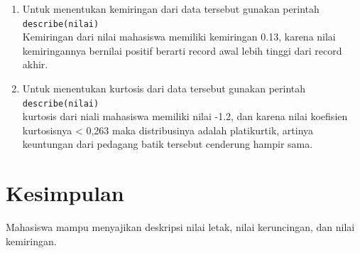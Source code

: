 \documentclass[a4paper,12pt]{article}
\begin{document}
\begin{enumerate}[label=\alph*.]
	\item 
	\begin{minipage}[t]{\linewidth}
		\raggedright
	\end{minipage}
	Untuk menentukan kemiringan dari data tersebut gunakan perintah\\
	\texttt{describe(nilai)}\\
	Kemiringan dari nilai mahasiswa memiliki kemiringan 0.13, karena nilai kemiringannya bernilai positif berarti record awal lebih tinggi dari record akhir.
	
	\item 
	\begin{minipage}[t]{\linewidth}
		\raggedright
	\end{minipage}
	Untuk menentukan kurtosis dari data tersebut gunakan perintah\\
	\texttt{describe(nilai)}\\
	kurtosis dari niali mahasiswa memiliki nilai -1.2, dan karena nilai koefisien kurtosisnya < 0,263 maka distribusinya adalah platikurtik, artinya keuntungan dari pedagang batik tersebut cenderung hampir sama.
\end{enumerate}
\newpage
\section{Kesimpulan}
Mahasiswa mampu menyajikan deskripsi nilai letak, nilai keruncingan, dan nilai kemiringan.
\end{document}
